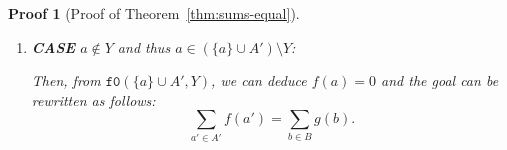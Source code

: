 \documentclass[pdflatex,sn-mathphys]{sn-jnl}%
\theoremstyle{thmstyleone}%
\theoremstyle{thmstyletwo}%
\newtheorem*{pf}{Proof}%
\theoremstyle{thmstylethree}%
\begin{document}
\begin{appendices}
\begin{pf}[Proof of Theorem~\ref{thm:sums-equal}]
\begin{enumerate}
\begin{enumerate}
\begin{enumerate}
             Given $b\in{}B\setminus\{\beta_r(a)\}$ and assuming that
             $\beta_r^{-1}(b)\notin{}A'$, let us show
             \begin{equation*}
               \boxed{g(b)=0.}
             \end{equation*}

             From the previous assumption
             $\mathtt{g0}(B,\{a\}\cup{}A',\beta)$, it is sufficient to
             show the two following points:
             \begin{enumerate}
             \item $\boxed{b\in{}B.}$
             \item $\boxed{\beta^{-1}(b)\notin\{a\}\cup{}A'.}$ 
             \end{enumerate}

             \vspace{10pt}

             \begin{enumerate}
             \item $\boxed{b\in{}B.}$ Trivial from
               $b\in{}B\setminus{\beta_r(a)}$.
             \item $\boxed{\beta^{-1}(b)\notin\{a\}\cup{}A'.}$ Then, we
               must show the two following points:

               \begin{itemize}
               \item $\boxed{\beta^{-1}(b)\neq{}a.}$ If
                 $\beta^{-1}(b)=a$, then $\beta_r^{-1}(b)\notin{}A'$ is
                 a contradiction since $b$ is not defined in the domain
                 of $\beta_r^{-1}$. Otherwise, $\beta^{-1}(b)\neq{}a$.
               \item $\boxed{\beta^{-1}(b)\notin{}A'.}$ Trivial from
                 $\beta_r^{-1}(b)\notin{}A'$ and knowing now that
                 $\beta^{-1}(b)\neq{}a$.
               \end{itemize}
             \end{enumerate}
             
           \end{enumerate}

           \vspace{10pt}
           
         \item \textbf{CASE} $a\notin{}Y$ and thus $a\in{}(\{a\}\cup{}A')\setminus{}Y$:

           Then, from $\mathtt{f0}(\{a\}\cup{}A',Y)$, we can deduce
           $f(a)=0$ and the goal can be rewritten as follows:
           \begin{equation*}
             \boxed{\sum\limits_{a'\in{}A'}f(a')=\sum\limits_{b\in{}B}g(b).}
           \end{equation*}


\end{enumerate}
\end{enumerate}
\end{pf}
\end{appendices}
\end{document}
